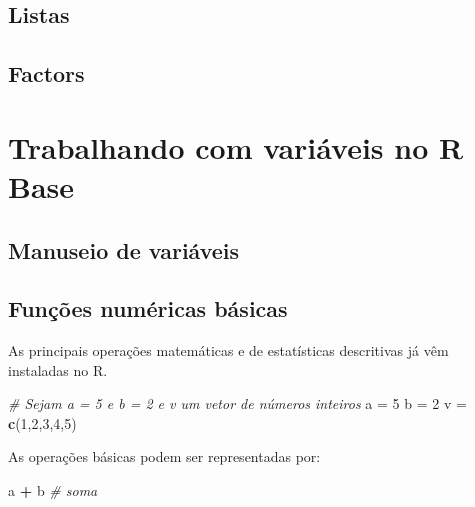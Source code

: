 \documentclass[
]{book}
\newenvironment{Shaded}{\begin{snugshade}}{\end{snugshade}}
\newcommand{\CommentTok}[1]{\textcolor[rgb]{0.56,0.35,0.01}{\textit{#1}}}
\newcommand{\DecValTok}[1]{\textcolor[rgb]{0.00,0.00,0.81}{#1}}
\newcommand{\KeywordTok}[1]{\textcolor[rgb]{0.13,0.29,0.53}{\textbf{#1}}}
\newcommand{\NormalTok}[1]{#1}
\newcommand{\OperatorTok}[1]{\textcolor[rgb]{0.81,0.36,0.00}{\textbf{#1}}}
\newcommand{\StringTok}[1]{\textcolor[rgb]{0.31,0.60,0.02}{#1}}
\begin{document}
\hypertarget{listas}{%
\section{Listas}\label{listas}}

\hypertarget{factors}{%
\section{Factors}\label{factors}}

\hypertarget{trabalhando-com-variuxe1veis-no-r-base}{%
\chapter{Trabalhando com variáveis no R Base}\label{trabalhando-com-variuxe1veis-no-r-base}}

\hypertarget{manuseio-de-variuxe1veis}{%
\section{Manuseio de variáveis}\label{manuseio-de-variuxe1veis}}

\hypertarget{funuxe7uxf5es-numuxe9ricas-buxe1sicas}{%
\section{Funções numéricas básicas}\label{funuxe7uxf5es-numuxe9ricas-buxe1sicas}}

As principais operações matemáticas e de estatísticas descritivas já vêm instaladas no R.

\begin{Shaded}
\begin{Highlighting}[]
\CommentTok{# Sejam a = 5 e b = 2 e v um vetor de números inteiros}
\NormalTok{a =}\StringTok{ }\DecValTok{5}
\NormalTok{b =}\StringTok{ }\DecValTok{2}
\NormalTok{v =}\StringTok{ }\KeywordTok{c}\NormalTok{(}\DecValTok{1}\NormalTok{,}\DecValTok{2}\NormalTok{,}\DecValTok{3}\NormalTok{,}\DecValTok{4}\NormalTok{,}\DecValTok{5}\NormalTok{)}
\end{Highlighting}
\end{Shaded}

As operações básicas podem ser representadas por:

\begin{Shaded}
\begin{Highlighting}[]
\NormalTok{a }\OperatorTok{+}\StringTok{ }\NormalTok{b }\CommentTok{# soma}
\end{Highlighting}
\end{Shaded}
\end{document}
